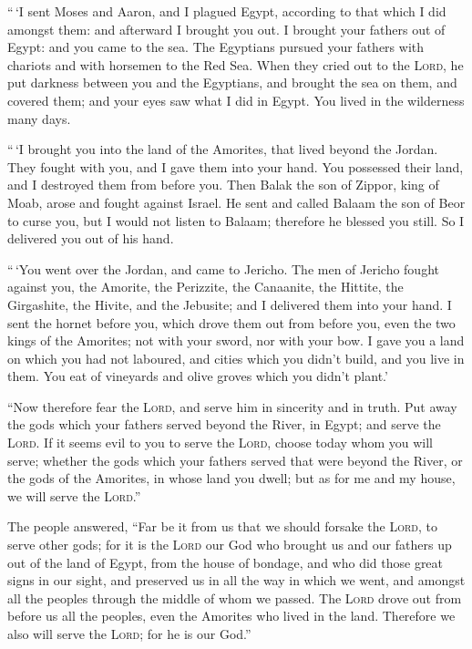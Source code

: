  ``\,`I sent Moses and Aaron, and I plagued Egypt,
according to that which I did amongst them: and afterward I brought you
out.  I brought your fathers out of Egypt: and you came to
the sea. The Egyptians pursued your fathers with chariots and with
horsemen to the Red Sea.  When they cried out to the
\textsc{Lord}, he put darkness between you and the Egyptians, and
brought the sea on them, and covered them; and your eyes saw what I did
in Egypt. You lived in the wilderness many days.

 ``\,`I brought you into the land of the Amorites, that
lived beyond the Jordan. They fought with you, and I gave them into your
hand. You possessed their land, and I destroyed them from before you.
 Then Balak the son of Zippor, king of Moab, arose and
fought against Israel. He sent and called Balaam the son of Beor to
curse you,  but I would not listen to Balaam; therefore
he blessed you still. So I delivered you out of his hand.

 ``\,`You went over the Jordan, and came to Jericho. The
men of Jericho fought against you, the Amorite, the Perizzite, the
Canaanite, the Hittite, the Girgashite, the Hivite, and the Jebusite;
and I delivered them into your hand.  I sent the hornet
before you, which drove them out from before you, even the two kings of
the Amorites; not with your sword, nor with your bow.  I
gave you a land on which you had not laboured, and cities which you
didn't build, and you live in them. You eat of vineyards and olive
groves which you didn't plant.'

 ``Now therefore fear the \textsc{Lord}, and serve him in
sincerity and in truth. Put away the gods which your fathers served
beyond the River, in Egypt; and serve the \textsc{Lord}. 
If it seems evil to you to serve the \textsc{Lord}, choose today whom
you will serve; whether the gods which your fathers served that were
beyond the River, or the gods of the Amorites, in whose land you dwell;
but as for me and my house, we will serve the \textsc{Lord}.''

 The people answered, ``Far be it from us that we should
forsake the \textsc{Lord}, to serve other gods;  for it
is the \textsc{Lord} our God who brought us and our fathers up out of
the land of Egypt, from the house of bondage, and who did those great
signs in our sight, and preserved us in all the way in which we went,
and amongst all the peoples through the middle of whom we passed.
 The \textsc{Lord} drove out from before us all the
peoples, even the Amorites who lived in the land. Therefore we also will
serve the \textsc{Lord}; for he is our God.''

